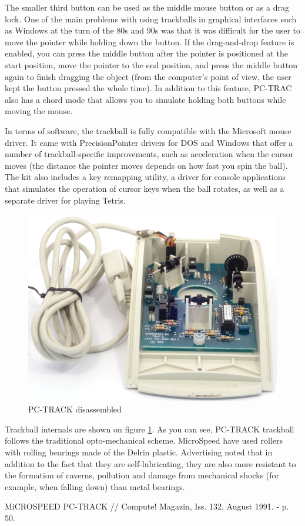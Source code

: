 \documentclass[11pt, a4paper]{article}
\begin{document}
The smaller third button can be used as the middle mouse button or as a drag lock. One of the main problems with using trackballs in graphical interfaces such as Windows at the turn of the 80s and 90s was that it was difficult for the user to move the pointer while holding down the button. If the drag-and-drop feature is enabled, you can press the middle button after the pointer is positioned at the start position, move the pointer to the end position, and press the middle button again to finish dragging the object (from the computer's point of view, the user kept the button pressed the whole time). In addition to this feature, PC-TRAC also has a chord mode that allows you to simulate holding both buttons while moving the mouse.

In terms of software, the trackball is fully compatible with the Microsoft mouse driver. It came with PrecisionPointer drivers for DOS and Windows that offer a number of trackball-specific improvements, such as acceleration when the cursor moves (the distance the pointer moves depends on how fast you spin the ball). The kit also includes a key remapping utility, a driver for console applications that simulates the operation of cursor keys when the ball rotates, as well as a separate driver for playing Tetris.

\begin{figure}[h]
    \centering
    \includegraphics[scale=0.7]{1991_microspeed_pc-track/inside_30.jpg}
    \caption{PC-TRACK disassembled}
    \label{fig:PCTRACKInside}
    \end{figure}

Trackball internals are shown on figure \ref{fig:PCTRACKInside}. As you can see, PC-TRACK trackball follows the traditional opto-mechanical scheme. MicroSpeed have used rollers with rolling bearings made of the Delrin plastic. Advertising noted that in addition to the fact that they are self-lubricating, they are also more resistant to the formation of caverns, pollution and damage from mechanical shocks (for example, when falling down) than metal bearings.

\begin{thebibliography}{9}
 MiCROSPEED PC-TRACK // Compute! Magazin,  Iss. 132, August 1991. - p. 50.
\end{thebibliography}
\end{document}

